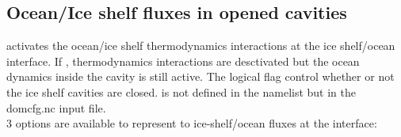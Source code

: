 \documentclass[../main/NEMO_manual]{subfiles}
\begin{document}
  \subsection{Ocean/Ice shelf fluxes in opened cavities}

      activates the ocean/ice shelf thermodynamics interactions at the ice shelf/ocean interface. 
     If , thermodynamics interactions are desctivated but the ocean dynamics inside the cavity is still active.
     The logical flag  control whether or not the ice shelf cavities are closed.  is not defined in the namelist but in the domcfg.nc input file.\\

     3 options are available to represent to ice-shelf/ocean fluxes at the interface:
\end{document}

